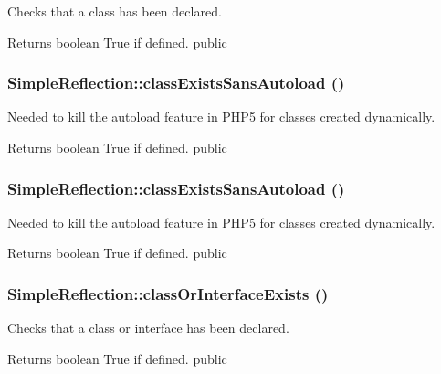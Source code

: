 \label{class_simple_reflection_a168085582bea3184f879f72ca081d833}
Checks that a class has been declared. \begin{DoxyReturn}{Returns}
boolean True if defined.  public 
\end{DoxyReturn}
\hypertarget{class_simple_reflection_a9bd0c823a0712540af7dcf77b371ff31}{
\subsubsection[{classExistsSansAutoload}]{\setlength{\rightskip}{0pt plus 5cm}SimpleReflection::classExistsSansAutoload ()}}
\label{class_simple_reflection_a9bd0c823a0712540af7dcf77b371ff31}
Needed to kill the autoload feature in PHP5 for classes created dynamically. \begin{DoxyReturn}{Returns}
boolean True if defined.  public 
\end{DoxyReturn}
\hypertarget{class_simple_reflection_a9bd0c823a0712540af7dcf77b371ff31}{
\subsubsection[{classExistsSansAutoload}]{\setlength{\rightskip}{0pt plus 5cm}SimpleReflection::classExistsSansAutoload ()}}
\label{class_simple_reflection_a9bd0c823a0712540af7dcf77b371ff31}
Needed to kill the autoload feature in PHP5 for classes created dynamically. \begin{DoxyReturn}{Returns}
boolean True if defined.  public 
\end{DoxyReturn}
\hypertarget{class_simple_reflection_af18aa4a7e354dcf43a5423b27a2a8760}{
\subsubsection[{classOrInterfaceExists}]{\setlength{\rightskip}{0pt plus 5cm}SimpleReflection::classOrInterfaceExists ()}}
\label{class_simple_reflection_af18aa4a7e354dcf43a5423b27a2a8760}
Checks that a class or interface has been declared. \begin{DoxyReturn}{Returns}
boolean True if defined.  public 
\end{DoxyReturn}
